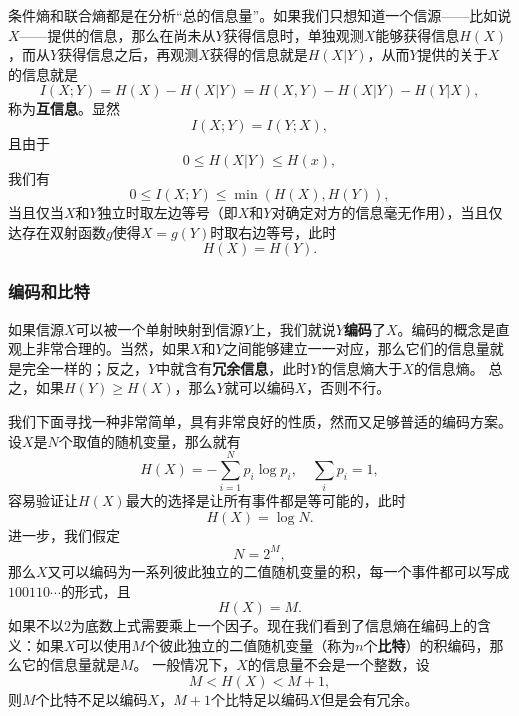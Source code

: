 \documentclass[UTF8, a4paper]{ctexart}
\begin{document}
条件熵和联合熵都是在分析“总的信息量”。如果我们只想知道一个信源——比如说$X$——提供的信息，那么在尚未从$Y$获得信息时，单独观测$X$能够获得信息$H(X)$，而从$Y$获得信息之后，再观测$X$获得的信息就是$H(X|Y)$，从而$Y$提供的关于$X$的信息就是
\begin{equation}
    I(X;Y) = H(X) - H(X|Y) = H(X, Y) - H(X|Y) - H(Y|X),
\end{equation}
称为\textbf{互信息}。显然
\begin{equation}
    I(X;Y) = I(Y;X),
\end{equation}
且由于
\[
    0 \leq H(X|Y) \leq H(x),
\]
我们有
\begin{equation}
    0 \leq I(X;Y) \leq \min(H(X), H(Y)),
\end{equation}
当且仅当$X$和$Y$独立时取左边等号（即$X$和$Y$对确定对方的信息毫无作用），当且仅达存在双射函数$g$使得$X=g(Y)$时取右边等号，此时
\[
    H(X) = H(Y).
\]

\subsubsection{编码和比特}

如果信源$X$可以被一个单射映射到信源$Y$上，我们就说$Y$\textbf{编码}了$X$。编码的概念是直观上非常合理的。当然，如果$X$和$Y$之间能够建立一一对应，那么它们的信息量就是完全一样的；反之，$Y$中就含有\textbf{冗余信息}，此时$Y$的信息熵大于$X$的信息熵。
总之，如果$H(Y) \geq H(X)$，那么$Y$就可以编码$X$，否则不行。

我们下面寻找一种非常简单，具有非常良好的性质，然而又足够普适的编码方案。设$X$是$N$个取值的随机变量，那么就有
\[
    H(X) = - \sum_{i=1}^N p_i \log p_i, \quad \sum_i p_i = 1,
\]
容易验证让$H(X)$最大的选择是让所有事件都是等可能的，此时
\begin{equation}
    H(X) = \log N.
\end{equation}
进一步，我们假定
\[
    N = 2^M,
\]
那么$X$又可以编码为一系列彼此独立的二值随机变量的积，每一个事件都可以写成$100110\cdots$的形式，且
\[
    H(X) = M.
\]
如果不以$2$为底数上式需要乘上一个因子。现在我们看到了信息熵在编码上的含义：如果$X$可以使用$M$个彼此独立的二值随机变量（称为$n$个\textbf{比特}）的积编码，那么它的信息量就是$M$。
一般情况下，$X$的信息量不会是一个整数，设
\[
    M < H(X) < M+1,
\]
则$M$个比特不足以编码$X$，$M+1$个比特足以编码$X$但是会有冗余。
\end{document}

